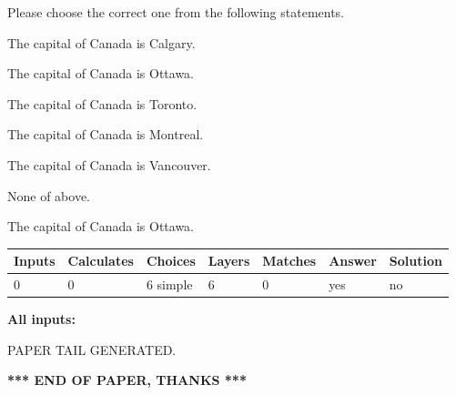 \documentclass[12pt]{article}
\begin{document}
  
Please choose the correct one from the following statements.
 
 
The capital of Canada is Calgary.
 
 
The capital of Canada is Ottawa.
 
 
The capital of Canada is Toronto.
 
 
The capital of Canada is Montreal.
 
 
The capital of Canada is Vancouver.
 
 
 None of above.
 
 
\noindent{}
 
 
The capital of Canada is Ottawa.
 
 
\noindent{}
 
 
   
   
   
   
\noindent\begin{tabular}{|l|l|l|l|l|l|l|}
 \hline
Inputs & Calculates & Choices & Layers & Matches & Answer & Solution \\ \hline
 0  & 
 0  & 
 6
  simple  
  & 
 6  & 
 0  & 
  yes & 
  no 
  \\ \hline
 \end{tabular}
   
   
   
   
\noindent{}
   
   
   
   
\noindent\vspace{0.1in}\hspace{-0.08in} {\textbf{\Large{All inputs: }}}
   
   
   
   
   
   
 \vspace{0.2in}
 
   
   
\vspace{2.0in} PAPER TAIL GENERATED.
   
   
   
   
\vspace{1.0in} 
{\textbf{\large{ *** END OF PAPER, THANKS *** }}} 
   
\end{document}
